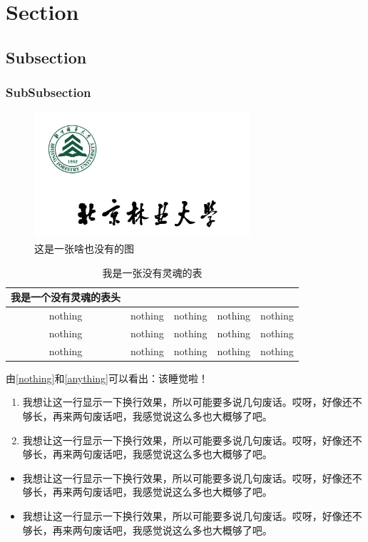 \documentclass{bjfuLabreport}
\begin{document}
	\makebjfuTitlePage
	\section{Section}
		\subsection{Subsection}
			\subsubsection{SubSubsection}
	
	\begin{figure}
		\centering
		\includegraphics[width = 8cm]{../files/header.png}
		\caption{这是一张啥也没有的图}
		\label{nothing}
	\end{figure}
	
	\begin{table}[h]
		\centering
		\caption{我是一张没有灵魂的表}
		\begin{tabular}{ccccc} 
			\toprule
			我是一个没有灵魂的表头\\
			\midrule
			nothing& nothing& nothing& nothing& nothing\\
			nothing& nothing& nothing& nothing& nothing\\
			nothing& nothing& nothing& nothing& nothing\\
			\bottomrule
		\end{tabular}
		\label{anything}
	\end{table}

	由\autoref{nothing}和\autoref{anything}可以看出：该睡觉啦！
	
	\begin{enumerate}
		\item 我想让这一行显示一下换行效果，所以可能要多说几句废话。哎呀，好像还不够长，再来两句废话吧，我感觉说这么多也大概够了吧。
		\item 我想让这一行显示一下换行效果，所以可能要多说几句废话。哎呀，好像还不够长，再来两句废话吧，我感觉说这么多也大概够了吧。\cite{VerdouwVan-Echteld-22}
	\end{enumerate}


	\begin{itemize}
		\item 我想让这一行显示一下换行效果，所以可能要多说几句废话。哎呀，好像还不够长，再来两句废话吧，我感觉说这么多也大概够了吧。
		\item 我想让这一行显示一下换行效果，所以可能要多说几句废话。哎呀，好像还不够长，再来两句废话吧，我感觉说这么多也大概够了吧。
	\end{itemize}
	
\end{document}
